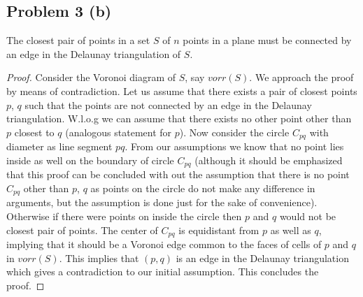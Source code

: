 	\subsection{Problem 3 (b)}

		\begin{theorem}
			The closest pair of points in a set $S$ of $n$ points in a plane must be connected by an 
			edge in the Delaunay triangulation of $S$. 
		\end{theorem}
		\begin{proof}
		Consider the Voronoi diagram of $S$, say $vorr(S)$. We approach the proof by means of contradiction. Let us assume that there exists a pair of closest points $p$, $q$ such that the points are not connected by an edge in the Delaunay triangulation. W.l.o.g we can assume that there exists no other point other than $p$ closest to $q$ (analogous statement for $p$). Now consider the circle $C_{pq}$ with diameter as line segment $pq$. From our assumptions we know that no point lies inside as well on the  boundary of circle $C_{pq}$ (although it should be emphasized that this proof can be concluded with out the assumption that there is no point $C_{pq}$ other than $p$, $q$ as points on the circle do not make any difference in arguments, but the assumption is done just for the sake of convenience). Otherwise if there were points on inside the circle then $p$ and $q$ would not be closest pair of points. The center of $C_{pq}$ is equidistant from $p$ as well as $q$, implying that it should be a Voronoi edge common to the faces of cells of $p$ and $q$ in $vorr(S)$. This implies that $(p,q)$ is an edge in the Delaunay triangulation which gives a contradiction to our initial assumption. This concludes the proof.		
		\end{proof}

